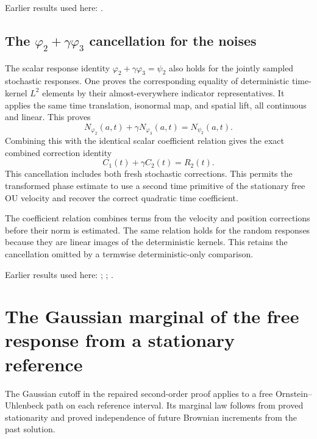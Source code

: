 \documentclass[11pt,a4paper]{report}
\begin{document}
Earlier results used here: \cite[Section~3.8.17]{LangevinLean2026ULASC}.
\subsection{\texorpdfstring{The \(\varphi _{2}+\gamma \varphi _{3}\) cancellation for the noises}{The φ ₂+γ φ ₃ cancellation for the noises}}
\label{report-step-KineticLangevin-FreeOUCorrection-lean-4}


The scalar response identity \(\varphi_2+\gamma\varphi_3=\psi_2\) also holds for the jointly sampled stochastic responses. One proves the corresponding equality of deterministic time-kernel \(L^{2}\) elements by their almost-everywhere indicator representatives. It applies the same time translation, isonormal map, and spatial lift, all continuous and linear. This proves \[N_{\varphi_2}(a,t)+\gamma N_{\varphi_3}(a,t)=N_{\psi_2}(a,t).\] Combining this with the identical scalar coefficient relation gives the exact combined correction identity \[C_1(t)+\gamma C_2(t)=R_2(t).\] This cancellation includes both fresh stochastic corrections. This permits the transformed phase estimate to use a second time primitive of the stationary free OU velocity and recover the correct quadratic time coefficient.



The coefficient relation combines terms from the velocity and position corrections before their norm is estimated. The same relation holds for the random responses because they are linear images of the deterministic kernels. This retains the cancellation omitted by a termwise deterministic-only comparison.



Earlier results used here: \cite[Section~3.6.12]{LangevinLean2026ULASC}; \cite[Section~3.8.17]{LangevinLean2026ULASC}; \cite[Section~3.8.5]{LangevinLean2026ULASC}.
\section{\texorpdfstring{The Gaussian marginal of the free response from a stationary reference}{The Gaussian marginal of the free response from a stationary reference}}
\label{proof-module-KineticLangevin-CanonicalFreeOU-lean}


The Gaussian cutoff in the repaired second-order proof applies to a free Ornstein–Uhlenbeck path on each reference interval. Its marginal law follows from proved stationarity and proved independence of future Brownian increments from the past solution.
\end{document}
